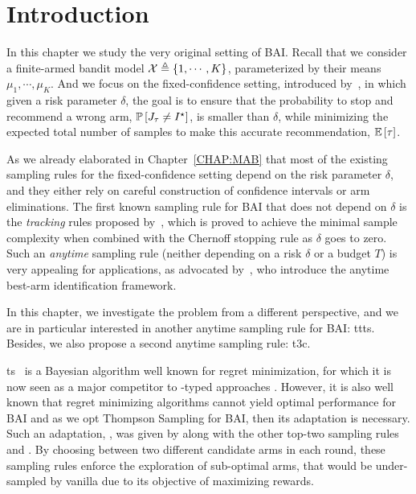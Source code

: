 \section{Introduction}\label{sec:t3c.intro}

In this chapter we study the very original setting of BAI. Recall that we consider a finite-armed bandit model $\mathcal{X}\triangleq\{1,\cdots,K\}$, parameterized by their means $\mu_1, \cdots, \mu_K$. And we focus on the fixed-confidence setting, introduced by~\cite{even-dar2003confidence}, in which given a risk parameter $\delta$, the goal is to ensure that the probability to stop and recommend a wrong arm, $\mathbb{P}\left[J_\tau \neq I^\star\right]$, is smaller than $\delta$, while minimizing the expected total number of samples to make this accurate recommendation, $\mathbb{E}\left[\tau\right]$. 


As we already elaborated in Chapter~\ref{CHAP:MAB} that most of the existing sampling rules for the fixed-confidence setting depend on the risk parameter $\delta$, and they either rely on careful construction of confidence intervals or arm eliminations. The first known sampling rule for BAI that does not depend on $\delta$ is the \emph{tracking} rules proposed by~\cite{garivier2016tracknstop}, which is proved to achieve the minimal sample complexity when combined with the Chernoff stopping rule as $\delta$ goes to zero. Such an \emph{anytime} sampling rule (neither depending on a risk $\delta$ or a budget $T$) is very appealing for applications, as advocated by~\cite{jun2016atlucb}, who introduce the anytime best-arm identification framework. 

In this chapter, we investigate the problem from a different perspective, and we are in particular interested in another anytime sampling rule for BAI: \gls{ttts}. Besides, we also propose a second anytime sampling rule: \gls{t3c}.


\gls{ts}~\citep{thompson1933} is a Bayesian algorithm well known for regret minimization, for which it is now seen as a major competitor to \UCB-typed approaches \citep{burnetas1996optimal,auer2002ucb,cappe2013klucb}. However, it is also well known that regret minimizing algorithms cannot yield optimal performance for BAI \citep{bubeck2011pure,kaufmann2017survey} and as we opt Thompson Sampling for BAI, then its adaptation is necessary. Such an adaptation, \TTTS, was given by \citet{russo2016ttts} along with the other top-two sampling rules \TTPS and \TTVS. By choosing between two different candidate arms in each round, these sampling rules enforce the exploration of sub-optimal arms, that would be under-sampled by vanilla \TS due to its objective of maximizing rewards.

